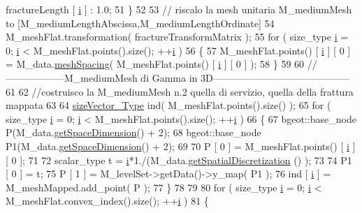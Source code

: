 \begin{DoxyCode}
      fractureLength [ \hyperlink{matrici_8m_a6f6ccfcf58b31cb6412107d9d5281426}{i} ] : 1.0;
51     \}
52 
53     \textcolor{comment}{// riscalo la mesh unitaria M\_mediumMesh to [M\_mediumLengthAbscissa,M\_mediumLengthOrdinate]}
54     M\_meshFlat.transformation( fractureTransformMatrix );
55     \textcolor{keywordflow}{for} ( size\_type \hyperlink{matrici_8m_a6f6ccfcf58b31cb6412107d9d5281426}{i} = 0; \hyperlink{matrici_8m_a6f6ccfcf58b31cb6412107d9d5281426}{i} < M\_meshFlat.points().size(); ++\hyperlink{matrici_8m_a6f6ccfcf58b31cb6412107d9d5281426}{i} )
56     \{
57         M\_meshFlat.points() [ \hyperlink{matrici_8m_a6f6ccfcf58b31cb6412107d9d5281426}{i} ] [ 0 ] = M\_data.\hyperlink{classFractureData_ab79d66dd830b6e1c55ade0d940c5c8cf}{meshSpacing}( M\_meshFlat.points() [ 
      \hyperlink{matrici_8m_a6f6ccfcf58b31cb6412107d9d5281426}{i} ] [ 0 ] );
58     \}
59     
60     \textcolor{comment}{//------------------M\_mediumMesh di Gamma in 3D------------------------------------------}
61 
62     \textcolor{comment}{//costruisco la M\_mediumMesh n.2 quella di servizio, quella della frattura mappata}
63 
64     \hyperlink{Core_8h_a83c51913d041a5001e8683434c09857f}{sizeVector\_Type} ind( M\_meshFlat.points().size() );
65     \textcolor{keywordflow}{for} ( size\_type \hyperlink{matrici_8m_a6f6ccfcf58b31cb6412107d9d5281426}{i} = 0; \hyperlink{matrici_8m_a6f6ccfcf58b31cb6412107d9d5281426}{i} < M\_meshFlat.points().size(); ++\hyperlink{matrici_8m_a6f6ccfcf58b31cb6412107d9d5281426}{i} )
66     \{
67         bgeot::base\_node P(M\_data.\hyperlink{classFractureData_a4ead03266295fe14fa3285692f945d89}{getSpaceDimension}() + 2);
68         bgeot::base\_node P1(M\_data.\hyperlink{classFractureData_a4ead03266295fe14fa3285692f945d89}{getSpaceDimension}() + 2);
69         
70         P [ 0 ] = M\_meshFlat.points() [ \hyperlink{matrici_8m_a6f6ccfcf58b31cb6412107d9d5281426}{i} ] [ 0 ];
71 
72         scalar\_type t = \hyperlink{matrici_8m_a6f6ccfcf58b31cb6412107d9d5281426}{i}*1./(M\_data.\hyperlink{classFractureData_a5c10d579be7849be1a126c24982f8a23}{getSpatialDiscretization} () );
73 
74         P1 [ 0 ] = t;
75         P [ 1 ] =  M\_levelSet->getData()->y\_map( P1 );
76         ind [ \hyperlink{matrici_8m_a6f6ccfcf58b31cb6412107d9d5281426}{i} ] = M\_meshMapped.add\_point( P );
77     \}
78 
79 
80     \textcolor{keywordflow}{for} ( size\_type \hyperlink{matrici_8m_a6f6ccfcf58b31cb6412107d9d5281426}{i} = 0; \hyperlink{matrici_8m_a6f6ccfcf58b31cb6412107d9d5281426}{i} < M\_meshFlat.convex\_index().size(); ++\hyperlink{matrici_8m_a6f6ccfcf58b31cb6412107d9d5281426}{i} )
81     \{

\end{DoxyCode}
